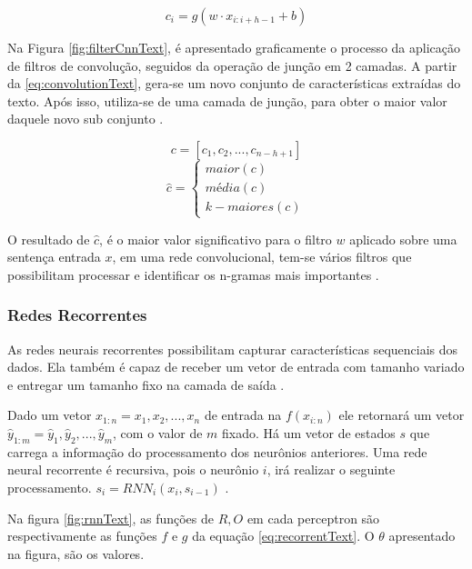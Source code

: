 \begin{equation}
	\label{eq:convolutionText}
	c_{i} = g(w \cdot x_{i:i+h-1} + b)
\end{equation}

Na Figura \ref{fig:filterCnnText}, é apresentado graficamente o processo da aplicação de filtros de convolução, seguidos da operação de junção em 2 camadas. A partir da \ref{eq:convolutionText}, gera-se um novo conjunto de características extraídas do texto. Após isso, utiliza-se de uma camada de junção, para obter o maior valor daquele novo sub conjunto \cite{KIM2014}.

$$c = [ c_{1}, c_{2}, ..., c_{n-h+1} ]$$
\begin{equation}
	\hat{c} = 
    \begin{cases}
    	maior(c) \\
        média(c) \\
        k-maiores(c) 
    \end{cases}
\end{equation}

O resultado de $\hat{c}$, é o maior valor significativo para o filtro $w$ aplicado sobre uma sentença entrada $x$, em uma rede convolucional, tem-se vários filtros que possibilitam processar \cite{KIM2014} e identificar os n-gramas mais importantes \cite{GOLDBERG2017}.

\subsubsection{Redes Recorrentes}

As redes neurais recorrentes possibilitam capturar características sequenciais dos dados. Ela também é capaz de receber um vetor de entrada com tamanho variado e entregar um tamanho fixo na camada de saída \cite{GOLDBERG2017}.

Dado um vetor $x_{1:n} = x_{1}, x_{2}, ..., x_{n}$ de entrada na $f(x_{i:n})$ ele retornará um vetor $\hat{y}_{1:m} = \hat{y}_{1}, \hat{y}_{2}, ..., \hat{y}_{m}$, com o valor de $m$ fixado. Há um vetor de estados $s$ que carrega a informação do processamento dos neurônios anteriores. Uma rede neural recorrente é recursiva, pois o neurônio $i$, irá realizar o seguinte processamento. $s_{i} = RNN_{i}(x_{i}, s_{i-1})$ \cite{MIKOLOV2010}.

Na figura \ref{fig:rnnText}, as funções de $R, O$ em cada perceptron são respectivamente as funções $f$ e $g$ da equação \ref{eq:recorrentText}. O $\theta$ apresentado na figura, são os valores.

